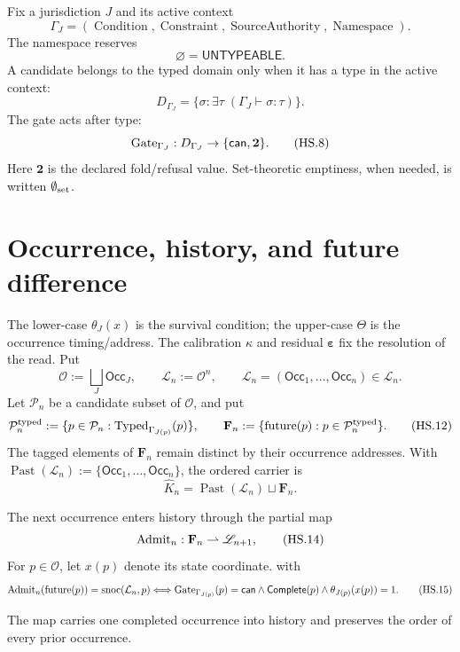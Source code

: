 \documentclass[10pt]{article}
\begin{document}
Fix a jurisdiction $J$ and its active context
\[
\Gamma_J=(\operatorname{Condition},\operatorname{Constraint},
\operatorname{SourceAuthority},\operatorname{Namespace}).
\tag{HS.5}
\]
The namespace reserves
\[
\varnothing=\mathsf{UNTYPEABLE}.
\tag{HS.6}
\]
A candidate belongs to the typed domain only when it has a type in the active
context:
\[
D_{\Gamma_J}=
\{\sigma:\exists\tau\;(\Gamma_J\vdash\sigma:\tau)\}.
\tag{HS.7}
\]
The gate acts after type:
\[
\operatorname{Gate}_{\Gamma_J}:D_{\Gamma_J}\to\{\mathsf{can},\mathbf2\}.
\tag{HS.8}
\]
Here $\mathbf2$ is the declared fold/refusal value. Set-theoretic emptiness,
when needed, is written $\emptyset_{\rm set}$.

\section{Occurrence, history, and future difference}


The lower-case $\theta_J(x)$ is the survival condition; the upper-case
$\Theta$ is the occurrence timing/address. The calibration $\kappa$ and
residual $\boldsymbol\varepsilon$ fix the resolution of the read. Put
\[
\mathscr O:=\bigsqcup_J\mathsf{Occ}_J,
\qquad
\mathscr L_n:=\mathscr O^n,
\qquad
\mathcal L_n=(\mathsf{Occ}_1,\ldots,\mathsf{Occ}_n)\in\mathscr L_n.
\tag{HS.11}
\]
Let $\mathcal P_n$ be a candidate subset of $\mathscr O$, and put
\[
\mathcal P_n^{\rm typed}:=
\{p\in\mathcal P_n:\operatorname{Typed}_{\Gamma_{J(p)}}(p)\},
\qquad
\mathbf F_n:=\{\operatorname{future}(p):p\in\mathcal P_n^{\rm typed}\}.
\tag{HS.12}
\]
The tagged elements of $\mathbf F_n$ remain distinct by their occurrence
addresses. With
$\operatorname{Past}(\mathcal L_n):=\{\mathsf{Occ}_1,\ldots,\mathsf{Occ}_n\}$,
the ordered carrier is
\[
\widehat K_n=\operatorname{Past}(\mathcal L_n)\sqcup\mathbf F_n.
\tag{HS.13}
\]

\begin{definition}[Occurrence]
The next occurrence enters history through the partial map
\[
\operatorname{Admit}_n:\mathbf F_n\rightharpoonup\mathscr L_{n+1},
\tag{HS.14}
\]
For $p\in\mathscr O$, let $x(p)$ denote its state coordinate.
with
\[
\operatorname{Admit}_n(\operatorname{future}(p))
=\operatorname{snoc}(\mathcal L_n,p)
\Longleftrightarrow
\operatorname{Gate}_{\Gamma_{J(p)}}(p)=\mathsf{can}
\land\mathsf{Complete}(p)
\land\theta_{J(p)}(x(p))=1.
\tag{HS.15}
\]
\end{definition}

The map carries one completed occurrence into history and preserves the order
of every prior occurrence.
\end{document}
